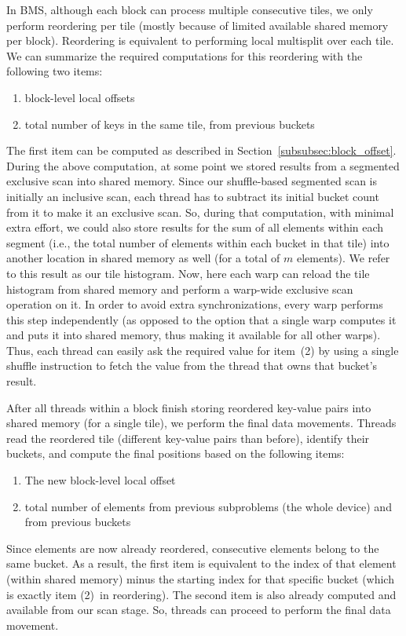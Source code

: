 In BMS, although each block can process multiple consecutive tiles, we only perform reordering per tile (mostly because of limited available shared memory per block).
Reordering is equivalent to performing local multisplit over each tile. We can summarize the required computations for this reordering with the following two items:
\begin{enumerate}
        \item block-level local offsets
        \item total number of keys in the same tile, from previous buckets
\end{enumerate}
The first item can be computed as described in Section~\ref{subsubsec:block_offset}.
During the above computation, at some point we stored results from a segmented exclusive scan into shared memory.
Since our shuffle-based segmented scan is initially an inclusive scan, each thread has to subtract its initial bucket count from it to make it an exclusive scan.  
So, during that computation, with minimal extra effort, we could also store results for the sum of all elements within each segment (i.e., the total number of elements within each bucket in that tile) into another location in shared memory as well (for a total of $m$ elements). We refer to this result as our tile histogram.
Now, here each warp can reload the tile histogram from shared memory and perform a warp-wide exclusive scan operation on it.
In order to avoid extra synchronizations, every warp performs this step independently (as opposed to the option that a single warp computes it and puts it into shared memory, thus making it available for all other warps).
Thus, each thread can easily ask the required value for item~(2) by using a single shuffle instruction to fetch the value from the thread that owns that bucket's result.

After all threads within a block finish storing reordered key-value pairs into shared memory (for a single tile), we perform the final data movements.
Threads read the reordered tile (different key-value pairs than before), identify their buckets, and compute the final positions based on the following items:
\begin{enumerate}[label=(\roman*)]
        \item The new block-level local offset
        \item total number of elements from previous subproblems (the whole device) and from previous buckets
\end{enumerate}
Since elements are now already reordered, consecutive elements belong to the same bucket. As a result, the first item is equivalent to the index of that element (within shared memory) minus the starting index for that specific bucket (which is exactly item (2)~in reordering).
The second item is also already computed and available from our scan stage.
So, threads can proceed to perform the final data movement.
